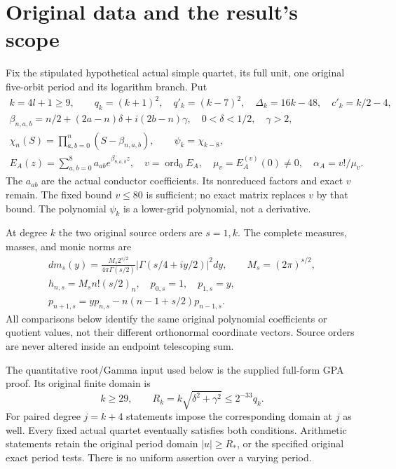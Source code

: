 \documentclass[11pt,a4paper]{article}
\begin{document}
\section{Original data and the result's scope}
Fix the stipulated hypothetical actual simple quartet, its full unit, one original five-orbit period and its logarithm branch. Put
\begin{equation}
\begin{gathered}
 k=4l+1\ge9,\qquad q_k=(k+1)^2,\quad q'_k=(k-7)^2,\quad
 \Delta_k=16k-48,\quad c'_k=k/2-4,\\
 \beta_{n,a,b}=n/2+(2a-n)\delta+i(2b-n)\gamma,
 \quad0<\delta<1/2,\quad\gamma>2,\\
 \chi_n(S)=\prod_{a,b=0}^n(S-\beta_{n,a,b}),\qquad \psi_k=\chi_{k-8},\\
 E_A(z)=\sum_{a,b=0}^8a_{ab}e^{\beta_{8,a,b}z},\quad
 v=\operatorname{ord}_0E_A,\quad \mu_v=E_A^{(v)}(0)\ne0,\quad
 \alpha_A=v!/\mu_v .
\end{gathered}\label{eq:data}
\end{equation}
The $a_{ab}$ are the actual conductor coefficients. Its nonreduced factors and exact $v$ remain. The fixed bound $v\le80$ is sufficient; no exact matrix replaces $v$ by that bound. The polynomial $\psi_k$ is a lower-grid polynomial, not a derivative.

At degree $k$ the two original source orders are $s=1,k$. The complete measures, masses, and monic norms are
\begin{equation}
\begin{gathered}
 dm_s(y)=\frac{M_s2^{s/2}}{4\pi\Gamma(s/2)}
     |\Gamma(s/4+iy/2)|^2dy,\qquad M_s=(2\pi)^{s/2},\\
 h_{n,s}=M_sn!(s/2)_n,\quad p_{0,s}=1,\quad p_{1,s}=y,\\
 p_{n+1,s}=yp_{n,s}-n(n-1+s/2)p_{n-1,s}.
\end{gathered}\label{eq:measure}
\end{equation}
All comparisons below identify the same original polynomial coefficients or quotient values, not their different orthonormal coordinate vectors. Source orders are never altered inside an endpoint telescoping sum.

The quantitative root/Gamma input used below is the supplied full-form GPA proof. Its original finite domain is
\begin{equation}
 k\ge29,\qquad R_k=k\sqrt{\delta^2+\gamma^2}\le2^{-33}q_k .
 \label{eq:domain}
\end{equation}
For paired degree $j=k+4$ statements impose the corresponding domain at $j$ as well. Every fixed actual quartet eventually satisfies both conditions. Arithmetic statements retain the original period domain $|u|\ge R_*$, or the specified original exact period tests. There is no uniform assertion over a varying period.
\end{document}
